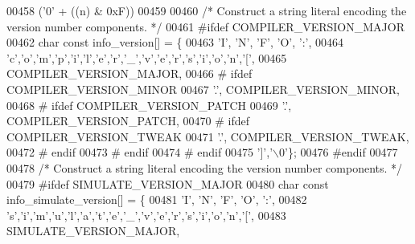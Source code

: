 \begin{DoxyCode}
{{{{{{{{{{{{{{{{{{{{{{{{{{{{{{{{{{{{{{{{{{{{00458 \textcolor{preprocessor}{  ('0' + ((n)     & 0xF))}
00459 
00460 \textcolor{comment}{/* Construct a string literal encoding the version number components. */}
00461 \textcolor{preprocessor}{#ifdef COMPILER\_VERSION\_MAJOR}
00462 \textcolor{keywordtype}{char} \textcolor{keyword}{const} info\_version[] = \{
00463   \textcolor{charliteral}{'I'}, \textcolor{charliteral}{'N'}, \textcolor{charliteral}{'F'}, \textcolor{charliteral}{'O'}, \textcolor{charliteral}{':'},
00464   \textcolor{charliteral}{'c'},\textcolor{charliteral}{'o'},\textcolor{charliteral}{'m'},\textcolor{charliteral}{'p'},\textcolor{charliteral}{'i'},\textcolor{charliteral}{'l'},\textcolor{charliteral}{'e'},\textcolor{charliteral}{'r'},\textcolor{charliteral}{'\_'},\textcolor{charliteral}{'v'},\textcolor{charliteral}{'e'},\textcolor{charliteral}{'r'},\textcolor{charliteral}{'s'},\textcolor{charliteral}{'i'},\textcolor{charliteral}{'o'},\textcolor{charliteral}{'n'},\textcolor{charliteral}{'['},
00465   COMPILER\_VERSION\_MAJOR,
00466 \textcolor{preprocessor}{# ifdef COMPILER\_VERSION\_MINOR}
00467   \textcolor{charliteral}{'.'}, COMPILER\_VERSION\_MINOR,
00468 \textcolor{preprocessor}{#  ifdef COMPILER\_VERSION\_PATCH}
00469    \textcolor{charliteral}{'.'}, COMPILER\_VERSION\_PATCH,
00470 \textcolor{preprocessor}{#   ifdef COMPILER\_VERSION\_TWEAK}
00471     \textcolor{charliteral}{'.'}, COMPILER\_VERSION\_TWEAK,
00472 \textcolor{preprocessor}{#   endif}
00473 \textcolor{preprocessor}{#  endif}
00474 \textcolor{preprocessor}{# endif}
00475   \textcolor{charliteral}{']'},\textcolor{charliteral}{'\(\backslash\)0'}\};
00476 \textcolor{preprocessor}{#endif}
00477 
00478 \textcolor{comment}{/* Construct a string literal encoding the version number components. */}
00479 \textcolor{preprocessor}{#ifdef SIMULATE\_VERSION\_MAJOR}
00480 \textcolor{keywordtype}{char} \textcolor{keyword}{const} info\_simulate\_version[] = \{
00481   \textcolor{charliteral}{'I'}, \textcolor{charliteral}{'N'}, \textcolor{charliteral}{'F'}, \textcolor{charliteral}{'O'}, \textcolor{charliteral}{':'},
00482   \textcolor{charliteral}{'s'},\textcolor{charliteral}{'i'},\textcolor{charliteral}{'m'},\textcolor{charliteral}{'u'},\textcolor{charliteral}{'l'},\textcolor{charliteral}{'a'},\textcolor{charliteral}{'t'},\textcolor{charliteral}{'e'},\textcolor{charliteral}{'\_'},\textcolor{charliteral}{'v'},\textcolor{charliteral}{'e'},\textcolor{charliteral}{'r'},\textcolor{charliteral}{'s'},\textcolor{charliteral}{'i'},\textcolor{charliteral}{'o'},\textcolor{charliteral}{'n'},\textcolor{charliteral}{'['},
00483   SIMULATE\_VERSION\_MAJOR,
}}}}}}}}}}}}}}}}}}}}}}}}}}}}}}}}}}}}}}}}}}}}
\end{DoxyCode}
